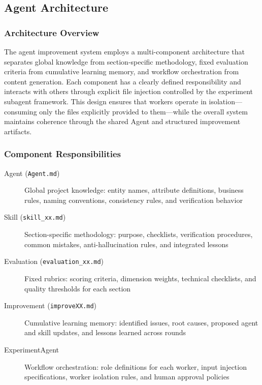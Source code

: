 
\subsection{Agent Architecture}

\subsubsection{Architecture Overview}

The agent improvement system employs a multi-component architecture that separates global knowledge from section-specific methodology, fixed evaluation criteria from cumulative learning memory, and workflow orchestration from content generation. Each component has a clearly defined responsibility and interacts with others through explicit file injection controlled by the experiment subagent framework. This design ensures that workers operate in isolation---consuming only the files explicitly provided to them---while the overall system maintains coherence through the shared Agent and structured improvement artifacts.

\subsubsection{Component Responsibilities}

\begin{description}
    \item[Agent (\texttt{Agent.md})] Global project knowledge: entity names, attribute definitions, business rules, naming conventions, consistency rules, and verification behavior
    \item[Skill (\texttt{skill\_xx.md})] Section-specific methodology: purpose, checklists, verification procedures, common mistakes, anti-hallucination rules, and integrated lessons
    \item[Evaluation (\texttt{evaluation\_xx.md})] Fixed rubrics: scoring criteria, dimension weights, technical checklists, and quality thresholds for each section
    \item[Improvement (\texttt{improveXX.md})] Cumulative learning memory: identified issues, root causes, proposed agent and skill updates, and lessons learned across rounds
    \item[ExperimentAgent] Workflow orchestration: role definitions for each worker, input injection specifications, worker isolation rules, and human approval policies
\end{description}


